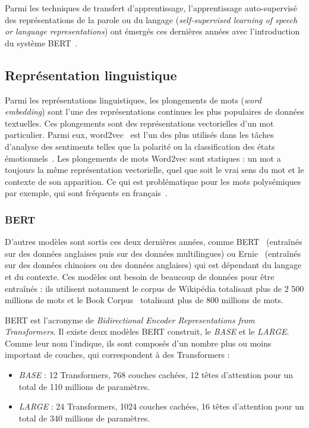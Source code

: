 Parmi les techniques de transfert d'apprentissage, l'apprentissage auto-supervisé des représentations de la parole ou du langage (\textit{self-supervised learning of speech or language representations}) ont émergés ces dernières années avec l'introduction du système BERT~\cite{Devlin2019}.

\subsection{Représentation linguistique}
Parmi les représentations linguistiques, les plongements de mots (\textit{word embedding}) sont l'une des représentations continues les plus populaires de données textuelles. Ces plongements sont des représentations vectorielles d'un mot particulier. Parmi eux, word2vec~\cite{word2vec} est l'un des plus utilisés dans les tâches d'analyse des sentiments telles que la polarité ou la classification des états émotionnels~\cite{Rodrigo2020,Dong2018}. Les plongements de mots Word2vec sont statiques : un mot a toujours la même représentation vectorielle, quel que soit le vrai sens du mot et le contexte de son apparition. Ce qui est problématique pour les mots polysémiques par exemple, qui sont fréquents en français~\cite{Pustejovsky1996}.

\subsubsection{BERT}
D'autres modèles sont sortis ces deux dernières années, comme BERT~\cite{Devlin2019} (entraînés sur des données anglaises puis sur des données multilingues) ou Ernie~\cite{Zhang2019Ernie} (entraînés sur des données chinoises ou des données anglaises) qui est dépendant du langage et du contexte. Ces modèles ont besoin de beaucoup de données pour être entraînés : ils utilisent notamment le corpus de Wikipédia totalisant plus de 2 500 millions de mots et le Book Corpus~\cite{Zhu2015} totalisant plus de 800 millions de mots.

BERT est l’acronyme de \textit{Bidirectional Encoder Representations from Transformers}. Il existe deux modèles BERT construit, le \textit{BASE} et le \textit{LARGE}. Comme leur nom l'indique, ils sont composés d'un nombre plus ou moins important de couches, qui correspondent à des Transformers :
\begin{itemize}
  \item \textit{BASE} : 12 Transformers, 768 couches cachées, 12 têtes d'attention pour un total de 110 millions de paramètres.
  \item \textit{LARGE} : 24 Transformers, 1024 couches cachées, 16 têtes d'attention pour un total de 340 millions de paramètres.
\end{itemize}


